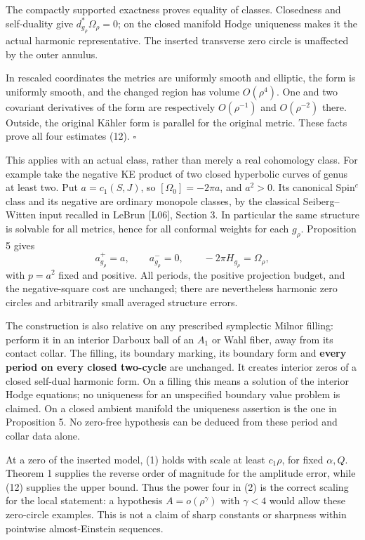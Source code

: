\documentclass[
  11pt,
]{article}
\begin{document}
The compactly supported exactness proves equality of classes. Closedness
and self-duality give \(d^*_{g_\rho}\Omega_\rho=0\); on the closed
manifold Hodge uniqueness makes it the actual harmonic representative.
The inserted transverse zero circle is unaffected by the outer annulus.

In rescaled coordinates the metrics are uniformly smooth and elliptic,
the form is uniformly smooth, and the changed region has volume
\(O(\rho^4)\). One and two covariant derivatives of the form are
respectively \(O(\rho^{-1})\) and \(O(\rho^{-2})\) there. Outside, the
original Kähler form is parallel for the original metric. These facts
prove all four estimates (12). \(\square\)

This applies with an actual class, rather than merely a real cohomology
class. For example take the negative KE product of two closed hyperbolic
curves of genus at least two. Put \(a=c_1(S,J)\), so
\([\Omega_0]=-2\pi a\), and \(a^2>0\). Its canonical Spin\(^c\) class
and its negative are ordinary monopole classes, by the classical
Seiberg--Witten input recalled in LeBrun {[}L06{]}, Section 3. In
particular the same structure is solvable for all metrics, hence for all
conformal weights for each \(g_\rho\). Proposition 5 gives \[
       a^+_{g_\rho}=a,\qquad a^-_{g_\rho}=0,\qquad
       -2\pi H_{g_\rho}=\Omega_\rho,
\] with \(p=a^2\) fixed and positive. All periods, the positive
projection budget, and the negative-square cost are unchanged; there are
nevertheless harmonic zero circles and arbitrarily small averaged
structure errors.

The construction is also relative on any prescribed symplectic Milnor
filling: perform it in an interior Darboux ball of an \(A_1\) or Wahl
fiber, away from its contact collar. The filling, its boundary marking,
its boundary form and \textbf{every period on every closed two-cycle}
are unchanged. It creates interior zeros of a closed self-dual harmonic
form. On a filling this means a solution of the interior Hodge
equations; no uniqueness for an unspecified boundary value problem is
claimed. On a closed ambient manifold the uniqueness assertion is the
one in Proposition 5. No zero-free hypothesis can be deduced from these
period and collar data alone.

At a zero of the inserted model, (1) holds with scale at least
\(c_1\rho\), for fixed \(\alpha,Q\). Theorem 1 supplies the reverse
order of magnitude for the amplitude error, while (12) supplies the
upper bound. Thus the power four in (2) is the correct scaling for the
local statement: a hypothesis \(A=o(\rho^\gamma)\) with \(\gamma<4\)
would allow these zero-circle examples. This is not a claim of sharp
constants or sharpness within pointwise almost-Einstein sequences.
\end{document}
